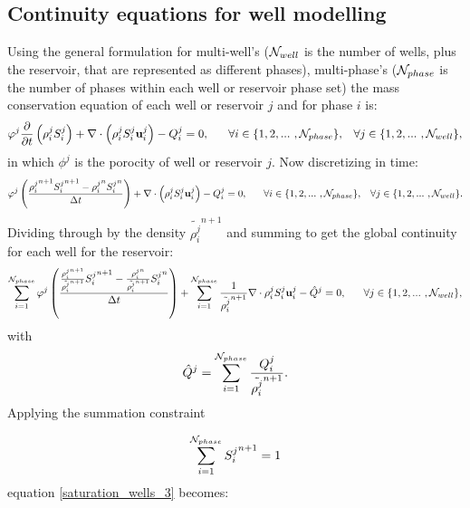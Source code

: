 \subsection{Continuity equations for well modelling} 
\label{Continuity equation for well modelling} 
Using the general formulation for multi-well's (${\cal N}_{well}$ is the number of wells, plus the reservoir, 
that are represented as different phases), multi-phase's (${\cal N}_{phase}$ is the number of phases within each well or reservoir phase set) the mass conservation equation of each well or reservoir $j$ and for phase $i$ is: 
\begin{equation} 
\phi^j \displaystyle\frac{\partial}{\partial t}\left( \rho_{i}^{j}S_i^{j}\right) + \nabla\cdot\left(\rho_{i}^{j}S_i^{j}\mathbf{u}_i^{j}\right) - Q_{i}^j = 0,
~~~~~ \forall i \in\{ 1,2,...~ , {\cal N}_{phase}\}, \;\;\; 
\forall j \in\{ 1,2,...~ , {\cal N}_{well} \}, 
\label{saturation_wells_1}
\end{equation}
in which $\phi^j$ is the porocity of well or reservoir $j$. 
Now discretizing in time: 
\begin{equation}
\phi^j \displaystyle \left( \frac{  
 {\rho_{i}^{j}}^{n+1} {S_i^{j}}^{n+1} - {\rho_{i}^{j}}^n {S_i^{j}}^n
}{\Delta t} \right) + \nabla\cdot\left(\rho_{i}^{j}S_i^{j}\mathbf{u}_i^{j}\right) - Q_{i}^j = 0, 
~~~~~ \forall i \in\{ 1,2,...~ , {\cal N}_{phase}\}, \;\;\; 
\forall j \in\{ 1,2,...~ , {\cal N}_{well} \}. 
\label{saturation_wells_2}
\end{equation}
Dividing through by the density  $\tilde{\rho_{i}^{j}}^{n+1}$ and summing to get the global continuity for each well 
for the reservoir: 
\begin{equation}
\sum\limits_{i=1}^{{\cal N}_{phase}} 
\phi^j 
\left(  \frac{  
 \frac{   {\rho_{i}^{j}}^{n+1} }
{  \tilde{\rho_{i}^{j}}^{n+1}  }
{S_i^{j}}^{n+1} 
-  
\frac{ {\rho_{i}^{j}}^{n} }
{  \tilde{\rho_{i}^{j}}^{n+1}  }
{S_i^{j}}^n
}
{\Delta t}
\right) 
+ 
\sum\limits_{i=1}^{{\cal N}_{phase}}
\frac{1}{  \tilde{\rho_{i}^{j}}^{n+1}   }
\nabla\cdot\rho_{i}^{j}S_i^{j}\mathbf{u}_i^{j} 
- \hat Q^j = 0, 
~~~~~ \forall j \in\{ 1,2,...~ , {\cal N}_{well}\}, 
\label{saturation_wells_3}
\end{equation}
with 
\begin{equation}
\hat Q^j= \sum\limits_{i=1}^{{\cal N}_{phase}} \frac{Q_i^j}{\tilde{\rho_{i}^{j}}^{n+1}}. 
\label{saturation_wells_3b}
\end{equation}
Applying the summation constraint 

\begin{equation}
\sum\limits_{i=1}^{{\cal N}_{phase}} 
{S_i^{j}}^{n+1}
= 1
\label{saturation_wells_3c}
\end{equation}  
equation 
\ref{saturation_wells_3} becomes: 

